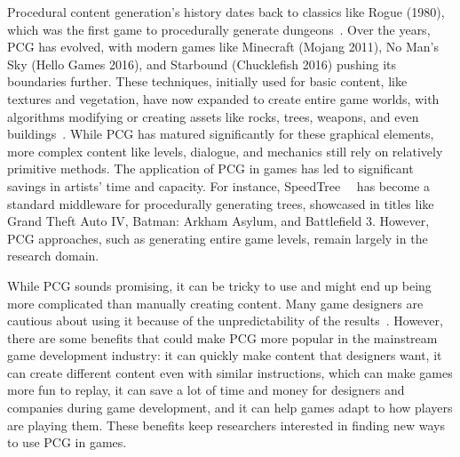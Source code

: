 \documentclass[runningheads]{llncs}
\begin{document}
Procedural content generation's history dates back to classics like Rogue (1980), which was the first game to procedurally generate dungeons~\cite{ref_article6}. Over the years, PCG has evolved, with modern games like Minecraft (Mojang 2011), No Man's Sky (Hello Games 2016), and Starbound (Chucklefish 2016) pushing its boundaries further. These techniques, initially used for basic content, like textures and vegetation, have now expanded to create entire game worlds, with algorithms modifying or creating assets like rocks, trees, weapons, and even buildings~\cite{ref_article7}. While PCG has matured significantly for these graphical elements, more complex content like levels, dialogue, and mechanics still rely on relatively primitive methods. The application of PCG in games has led to significant savings in artists' time and capacity. For instance, SpeedTree~\cite{ref_article8}~\cite{ref_article9} has become a standard middleware for procedurally generating trees, showcased in titles like Grand Theft Auto IV, Batman: Arkham Asylum, and Battlefield 3. However, PCG approaches, such as generating entire game levels, remain largely in the research domain. 

While PCG sounds promising, it can be tricky to use and might end up being more complicated than manually creating content. Many game designers are cautious about using it because of the unpredictability of the results~\cite{ref_article8}. However, there are some benefits that could make PCG more popular in the mainstream game development industry: it can quickly make content that designers want, it can create different content even with similar instructions, which can make games more fun to replay, it can save a lot of time and money for designers and companies during game development, and it can help games adapt to how players are playing them. These benefits keep researchers interested in finding new ways to use PCG in games.
\end{document}
